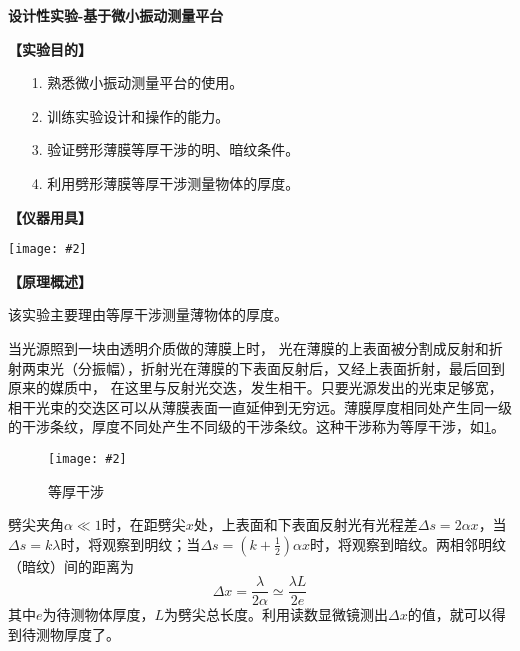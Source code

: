 \documentclass[11pt,a4paper]{ctexart}
\newcommand{\ExpeName}{设计性实验-基于微小振动测量平台}
\newcommand{\cpic}[2]{
\begin{center}
\texttt{[image: \#2]}
\end{center}
}
\newcommand{\cpicn}[3]
{
\begin{figure}[H]
\cpic{#1}{#2}
\caption{#3\label{#2}}
\end{figure}
}
\newcommand{\beq}{\begin{equation}}
\newcommand{\eeq}{\end{equation}}
\begin{document}
\newpage%
\begin{center}
\LARGE{\textbf{\ExpeName}}
\end{center}
\textbf{【实验目的】}
\begin{enumerate}
 \item[1.] 熟悉微小振动测量平台的使用。
 \item[2.] 训练实验设计和操作的能力。
 \item[3.] 验证劈形薄膜等厚干涉的明、暗纹条件。
 \item[4.] 利用劈形薄膜等厚干涉测量物体的厚度。
\end{enumerate}
\textbf{【仪器用具】}
\cpic{0.3}{t1}
\textbf{【原理概述】}\par
该实验主要理由等厚干涉测量薄物体的厚度。\par
当光源照到一块由透明介质做的薄膜上时， 光在薄膜的上表面被分割成反射和折射两束光（分振幅），折射光在薄膜的下表面反射后，又经上表面折射，最后回到原来的媒质中， 在这里与反射光交迭，发生相干。只要光源发出的光束足够宽，相干光束的交迭区可以从薄膜表面一直延伸到无穷远。薄膜厚度相同处产生同一级的干涉条纹，厚度不同处产生不同级的干涉条纹。这种干涉称为等厚干涉，如\cref{p1}。\cpicn{0.7}{p1}{等厚干涉}
\par
劈尖夹角$\alpha \ll 1$时，在距劈尖$x$处，上表面和下表面反射光有光程差$\Delta s = 2\alpha x$，当$\Delta s = k \lambda$时，将观察到明纹；当$\Delta s = (k + \frac{1}{2}) \alpha x$时，将观察到暗纹。两相邻明纹（暗纹）间的距离为
\beq
\Delta x = \frac{\lambda}{2 \alpha} \simeq \frac{\lambda L}{2e}
\eeq
其中$e$为待测物体厚度，$L$为劈尖总长度。利用读数显微镜测出$\Delta x$的值，就可以得到待测物厚度了。
\end{document}
